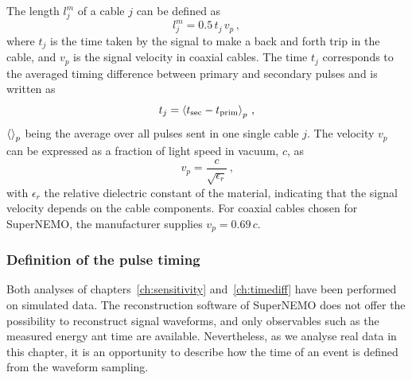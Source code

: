 The length $l_{j}^{m}$ of a cable $j$ can be defined as
\begin{equation}
  l_{j}^{m}= 0.5\,t_{j}\,v_{p}\, ,
\end{equation}
where $t_{j}$ is the time taken by the signal to make a back and forth trip in the cable, and $v_{p}$ is the signal velocity in coaxial cables.
The time $t_{j}$ corresponds to the averaged timing difference between primary and secondary pulses and is written as
\begin{equation}
  t_{j} = \braket{t_{\text{sec}}-t_{\text{prim}}}_{p} \, \text{,}
  \label{eq:t_j}
\end{equation}
$\braket{}_{p}$ being the average over all pulses sent in one single cable $j$.
The velocity $v_{p}$ can be expressed as a fraction of light speed in vacuum, $c$, as
\begin{equation*}
  v_{p}=\frac{c}{\sqrt{\epsilon_{r}}}\,\text{,}
\end{equation*}
with $\epsilon_{r}$ the relative dielectric constant of the material, indicating that the signal velocity depends on the cable components.
For coaxial cables chosen for SuperNEMO, the manufacturer supplies ${v_{p}=0.69\,c}$.

\subsubsection*{Definition of the pulse timing}

Both analyses of chapters~\ref{ch:sensitivity} and~\ref{ch:timediff} have been performed on simulated data.
The reconstruction software of SuperNEMO does not offer the possibility to reconstruct signal waveforms, and only observables such as the measured energy ant time are available.
Nevertheless, as we analyse real data in this chapter, it is an opportunity to describe how the time of an event is defined from the waveform sampling.

